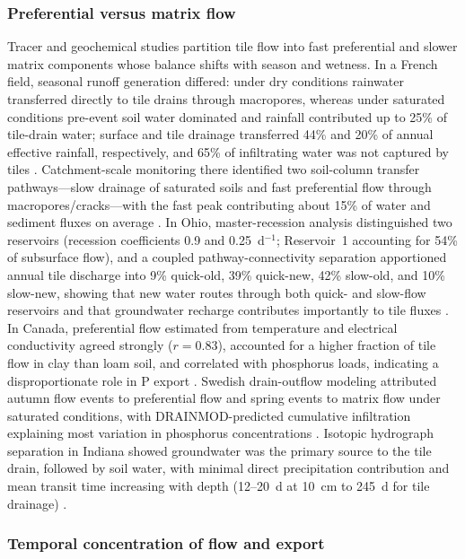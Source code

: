 \documentclass[11pt]{article}
\begin{document}
\subsubsection{Preferential versus matrix flow}

Tracer and geochemical studies partition tile flow into fast preferential and slower matrix components whose balance shifts with season and wetness. In a French field, seasonal runoff generation differed: under dry conditions rainwater transferred directly to tile drains through macropores, whereas under saturated conditions pre-event soil water dominated and rainfall contributed up to 25\% of tile-drain water; surface and tile drainage transferred 44\% and 20\% of annual effective rainfall, respectively, and 65\% of infiltrating water was not captured by tiles \parencite{Gaillot2023}. Catchment-scale monitoring there identified two soil-column transfer pathways---slow drainage of saturated soils and fast preferential flow through macropores/cracks---with the fast peak contributing about 15\% of water and sediment fluxes on average \parencite{Grangeon2021}. In Ohio, master-recession analysis distinguished two reservoirs (recession coefficients 0.9 and 0.25~d$^{-1}$; Reservoir~1 accounting for 54\% of subsurface flow), and a coupled pathway-connectivity separation apportioned annual tile discharge into 9\% quick-old, 39\% quick-new, 42\% slow-old, and 10\% slow-new, showing that new water routes through both quick- and slow-flow reservoirs and that groundwater recharge contributes importantly to tile fluxes \parencite{Nazari2021}. In Canada, preferential flow estimated from temperature and electrical conductivity agreed strongly ($r=0.83$), accounted for a higher fraction of tile flow in clay than loam soil, and correlated with phosphorus loads, indicating a disproportionate role in P export \parencite{Pluer2020}. Swedish drain-outflow modeling attributed autumn flow events to preferential flow and spring events to matrix flow under saturated conditions, with DRAINMOD-predicted cumulative infiltration explaining most variation in phosphorus concentrations \parencite{Salazar2011}. Isotopic hydrograph separation in Indiana showed groundwater was the primary source to the tile drain, followed by soil water, with minimal direct precipitation contribution and mean transit time increasing with depth (12--20~d at 10~cm to 245~d for tile drainage) \parencite{Williams2021}.

\subsubsection{Temporal concentration of flow and export}
\end{document}
